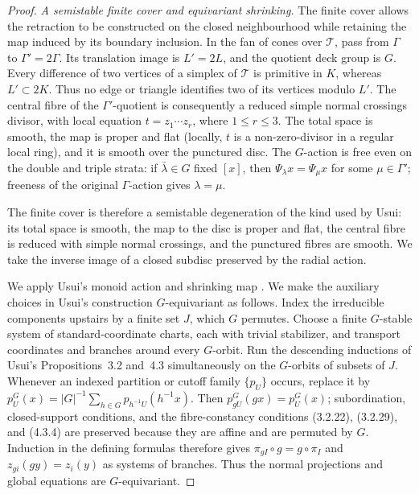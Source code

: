 \begin{proof}
\smallskip
\noindent\emph{A semistable finite cover and equivariant shrinking.}
The finite cover allows the retraction to be constructed on the closed
neighbourhood while retaining the map induced by its boundary inclusion.
In the fan of cones over $\mathcal T$, pass
from $\Gamma$ to $\Gamma'=2\Gamma$.  Its translation image is
$L'=2L$, and the quotient deck group is $G$.  Every difference of two
vertices
of a simplex of $\mathcal T$ is primitive in $K$, whereas $L'\subset2K$.
Thus no edge or triangle identifies two of its vertices modulo $L'$.
The central fibre of the $\Gamma'$-quotient is consequently a reduced
simple normal crossings divisor, with local equation
$t=z_1\cdots z_r$, where $1\le r\le3$.
The total space is smooth, the map is proper and flat (locally, $t$ is a
non-zero-divisor in a regular local ring), and it is smooth over the
punctured disc.  The $G$-action is free even on the double and
triple strata: if $\bar\lambda\in G$ fixed $[x]$, then
$\Psi_\lambda x=\Psi_\mu x$ for some $\mu\in\Gamma'$; freeness of the
original $\Gamma$-action gives $\lambda=\mu$.

The finite cover is therefore a semistable degeneration of the kind used by
Usui: its total space is smooth, the map to the disc is proper and flat, the
central fibre is reduced with simple normal crossings, and the punctured
fibres are smooth.  We take the inverse image of a closed subdisc preserved
by the radial action.

We apply Usui's monoid action and shrinking map
\citep[Theorem~5.2 and equations (5.2.5.2), (5.2.5.4), and (5.2.12)]{Usui2001}.
We make the auxiliary choices in Usui's construction $G$-equivariant as
follows.  Index the
irreducible components upstairs by a finite set $J$, which $G$ permutes.
Choose a finite $G$-stable system of standard-coordinate charts, each with
trivial stabilizer, and transport coordinates and branches around every
$G$-orbit.  Run the descending inductions of Usui's
Propositions~3.2 and~4.3 simultaneously on the $G$-orbits of subsets of
$J$.  Whenever an indexed partition or cutoff family
$\{p_U\}$ occurs, replace it by
$p_U^G(x)=|G|^{-1}\sum_{h\in G}p_{h^{-1}U}(h^{-1}x)$.
Then $p_{gU}^G(gx)=p_U^G(x)$; subordination, closed-support conditions,
and the fibre-constancy conditions (3.2.22), (3.2.29), and (4.3.4) are
preserved because they are affine and are permuted by $G$.  Induction in
the defining formulas therefore gives $\pi_{gI}\circ g=g\circ\pi_I$ and
$z_{gi}(gy)=z_i(y)$
as systems of branches.  Thus the normal projections and global equations
are $G$-equivariant.


\end{proof}
